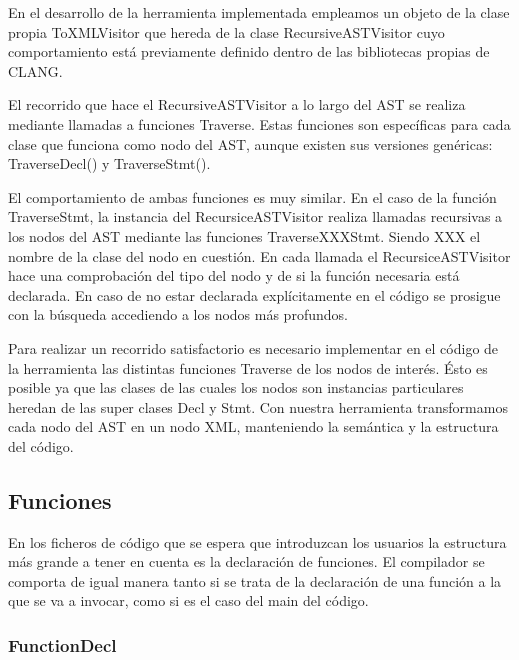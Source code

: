 En el desarrollo de la herramienta implementada empleamos un objeto de la clase propia ToXMLVisitor que hereda de la clase RecursiveASTVisitor cuyo comportamiento está previamente definido dentro de las bibliotecas propias de CLANG.

El recorrido que hace el RecursiveASTVisitor a lo largo del AST se realiza mediante llamadas a funciones Traverse. Estas funciones son específicas para cada clase que funciona como nodo del AST, aunque existen sus versiones genéricas: TraverseDecl() y TraverseStmt().

El comportamiento de ambas funciones es muy similar. En el caso de la función TraverseStmt, la instancia del RecursiceASTVisitor realiza llamadas recursivas a los nodos del AST mediante las funciones TraverseXXXStmt. Siendo XXX el nombre de la clase del nodo en cuestión. En cada llamada el RecursiceASTVisitor hace una comprobación del tipo del nodo y de si la función necesaria está declarada. En caso de no estar declarada explícitamente en el código se prosigue con la búsqueda accediendo a los nodos más profundos.

Para realizar un recorrido satisfactorio es necesario implementar en el código de la herramienta las distintas funciones Traverse de los nodos de interés. Ésto es posible ya que las clases de las cuales los nodos son instancias particulares heredan de las super clases Decl y Stmt. Con nuestra herramienta transformamos cada nodo del AST en un nodo XML, manteniendo la semántica y la estructura del código.

\subsection{Funciones}

En los ficheros de código que se espera que introduzcan los usuarios la estructura más grande a tener en cuenta es la declaración de funciones. El compilador se comporta de igual manera tanto si se trata de la declaración de una función a la que se va a invocar, como si es el caso del main del código.

\subsubsection*{FunctionDecl}

